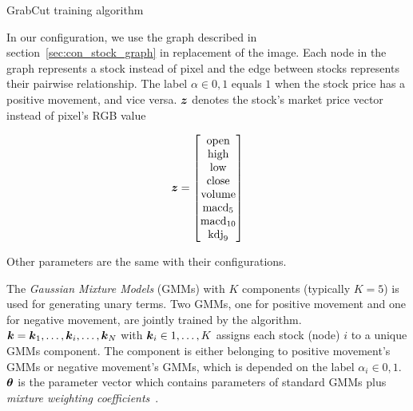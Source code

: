 \begin{algorithm}[tb]
  \begin{algorithmic}[1]
    \REPEAT
  \end{algorithmic}
  \caption{\label{alg:grabcut} GrabCut training algorithm}
\end{algorithm}

In our configuration, we use the graph described in
section~\ref{sec:con_stock_graph} in replacement of the image.
Each node in the graph represents a stock instead of pixel and
the edge between stocks represents their pairwise relationship.
The label $\alpha \in {0,1}$ equals $1$ when the stock price has
a positive movement, and vice versa. ${\boldsymbol{z}}$ denotes the stock's
market price vector instead of pixel's RGB value

\begin{align}
  \label{eq:feature_vector}
  \bz =
  \begin{bmatrix}
    \text{open} \\
    \text{high} \\
    \text{low} \\
    \text{close} \\
    \text{volume} \\
    \text{macd}_5 \\
    \text{macd}_{10} \\
    \text{kdj}_9
  \end{bmatrix}
\end{align}

\noindent Other parameters are the same with their configurations.

The \emph{Gaussian Mixture Models} (GMMs) with $K$ components
(typically $K=5$) is used for generating unary terms. Two GMMs,
one for positive movement and one for negative movement, are
jointly trained by the algorithm.
${\boldsymbol{k}}={{\boldsymbol{k}}_1,\dots,{\boldsymbol{k}}_i,\dots,{\boldsymbol{k}}_N}$ with ${\boldsymbol{k}}_i\in 1,\dots,K$
assigns each stock (node) $i$ to a unique GMMs component. The
component is either belonging to positive movement's GMMs or
negative movement's GMMs, which is depended on the label
$\alpha_i\in {0,1}$. $\boldsymbol{\theta}$ is the parameter vector which
contains parameters of standard GMMs plus \emph{mixture weighting
  coefficients}~\cite{Rother:SIGGRAPH04}.

